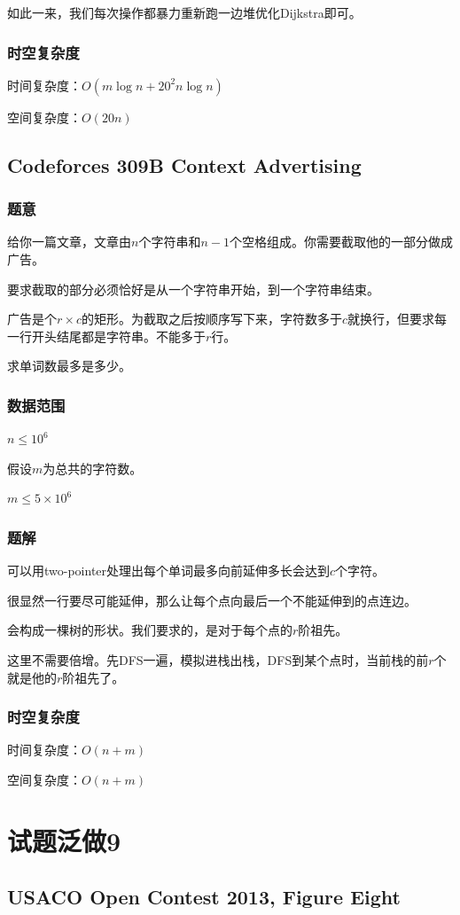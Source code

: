 \documentclass{ctexart}
\begin{document}
如此一来，我们每次操作都暴力重新跑一边堆优化Dijkstra即可。
\subsubsection{时空复杂度}
时间复杂度：$O(m \log n+20^2 n \log n)$

空间复杂度：$O(20n)$
\subsection{Codeforces 309B Context Advertising}
\subsubsection{题意}
给你一篇文章，文章由$n$个字符串和$n-1$个空格组成。你需要截取他的一部分做成广告。

要求截取的部分必须恰好是从一个字符串开始，到一个字符串结束。

广告是个$r \times c$的矩形。为截取之后按顺序写下来，字符数多于$c$就换行，但要求每一行开头结尾都是字符串。不能多于$r$行。

求单词数最多是多少。
\subsubsection{数据范围}
$n \le 10^6$

假设$m$为总共的字符数。

$m \le 5 \times 10^6$
\subsubsection{题解}
可以用two-pointer处理出每个单词最多向前延伸多长会达到$c$个字符。

很显然一行要尽可能延伸，那么让每个点向最后一个不能延伸到的点连边。

会构成一棵树的形状。我们要求的，是对于每个点的$r$阶祖先。

这里不需要倍增。先DFS一遍，模拟进栈出栈，DFS到某个点时，当前栈的前$r$个就是他的$r$阶祖先了。
\subsubsection{时空复杂度}
时间复杂度：$O(n+m)$

空间复杂度：$O(n+m)$
\newpage
\section{试题泛做9}
\subsection{USACO Open Contest 2013, Figure Eight}
\end{document}
